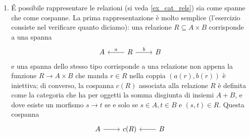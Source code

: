\begin{enumerate}
	\begin{itemize}
		\item $f_1 : [n_1] \to [n_1']$ è una funzione iniettiva e monotòna;
		\item $f_0 : [n_0] \to [n_0']$ è una funzione monotòna;
		\item il diagramma
		\[\begin{tikzcd}
			{[n_1]}\ar[r, "t"]\ar[d, hook, "{f_1}"'] & {[n_0]} \ar[d, "f_0"]\\
			{[n_1']} \ar[r, "{t'}"'] & {[n_0']} \\
		\end{tikzcd}\]
		è commutativo;
		\item $f_0^{-1}(H')\subseteq H$.
	\end{itemize}
	Mostrare che questo definisce una categoria $\cate{Seg}^{[{\circ}{\bullet}]}$ dei segmenti binari.\footnote{Un segmento binario è una rappresentazione discreta e semplificata di un cromosoma: la funzione $t$ determina una partizione di $[n_1]$ in $n_0$ sottoinsiemi $t^{-1}(1),t^{-1}(2),\dots t^{-1}(n_0)$ che si può rappresentare come
	\[[{\circ}{\circ}][{\circ}{\circ}{\circ}{\circ}][{\circ}]\]
	quando $n_0=3$ e $n_1=7$; il sottoinsieme $H\subseteq n_0$ determina poi le regioni del cromosoma $\chi$ che si vogliono usare nella replicazione, e il suo complementare $H^c$ quelle che sono silenziate (\emph{masking}). Se ad esempio $H\subseteq [3]$ è l'insieme $\{1,3\}$, possiamo colorare la partizione di sopra come
	\[[{\bullet}{\bullet}][{\circ}{\circ}{\circ}{\circ}][{\bullet}].\]
	Invitiamo chi legge a trovare quale possa essere una interpretazione per un omomorfismo di segmenti!}
\item \'E possibile rappresentare le relazioni (si veda \ref{ex_cat_rels}) sia come spanne che come cospanne. La prima rappresentazione è molto semplice (l'esercizio consiste nel verificare quanto diciamo): una relazione $R\subseteq A\times B$ corrisponde a una spanna
\[
  \begin{tikzcd}
  A & R \ar[r, "b"]\ar[l, "a"']& B
\end{tikzcd}
\]
e una spanna dello stesso tipo corrisponde a una relazione non appena la funzione $R \to A\times B$ che manda $r\in R$ nella coppia $(a(r),b(r))$ è iniettiva; di converso, la cospanna $c(R)$ associata alla relazione $R$ è definita come la categoria che ha per oggetti la somma disgiunta di insiemi $A+B$, e dove esiste un morfismo $s\to t$ se e solo se $s\in A,t\in B$ e $(s,t)\in R$. Questa cospanna
\[
  \begin{tikzcd}
  A \ar[r] & c(R) & \ar[l] B

\end{tikzcd}\]
\end{enumerate}
